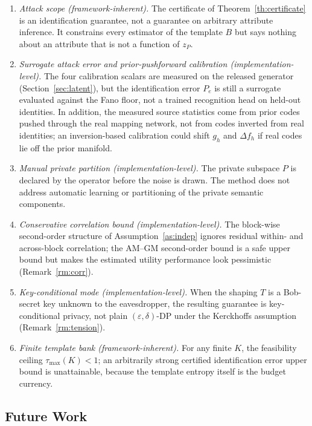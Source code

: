 \documentclass[10pt,twocolumn,letterpaper]{article}
\theoremstyle{plain}
\theoremstyle{definition}
\begin{document}
\begin{enumerate}
\item[(L1)] \emph{Attack scope (framework-inherent).} The certificate of
Theorem~\ref{th:certificate} is an identification guarantee, not a guarantee on
arbitrary attribute inference. It constrains every estimator of the template
$B$ but says nothing about an attribute that is not a function of $z_P$.
\item[(L2)] \emph{Surrogate attack error and prior-pushforward calibration
(implementation-level).}
The four calibration scalars are measured on the released generator
(Section~\ref{sec:latent}), but the identification error $P_e$ is still a
surrogate evaluated against the Fano floor, not a trained recognition head on
held-out identities. In addition, the measured source statistics come from
prior codes pushed through the real mapping network, not from codes inverted
from real identities; an inversion-based calibration could shift $g_h$ and
$\Delta f_h$ if real codes lie off the prior manifold.
\item[(L3)] \emph{Manual private partition (implementation-level).} The private subspace $P$ is
declared by the operator before the noise is drawn. The method does not address
automatic learning or partitioning of the private semantic components.
\item[(L4)] \emph{Conservative correlation bound (implementation-level).} The block-wise second-order
structure of Assumption~\ref{as:indep} ignores residual within- and
across-block correlation; the AM--GM second-order bound is a safe upper bound but makes the
estimated utility performance look pessimistic (Remark~\ref{rm:corr}).
\item[(L5)] \emph{Key-conditional mode (implementation-level).} When the shaping $T$ is a Bob-secret
key unknown to the eavesdropper, the resulting guarantee is key-conditional
privacy, not plain $(\varepsilon,\delta)$-DP under the Kerckhoffs assumption
(Remark~\ref{rm:tension}).
\item[(L6)] \emph{Finite template bank (framework-inherent).} For any finite $K$, the feasibility
ceiling $\tau_{\max}(K)<1$; an arbitrarily strong certified identification
error upper bound is unattainable, because the template entropy itself is the
budget currency.
\end{enumerate}

\subsection{Future Work}
\end{document}
